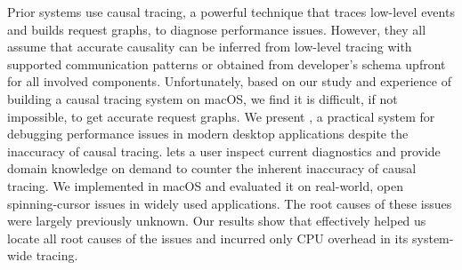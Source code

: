 Prior systems use causal tracing, a powerful technique that traces low-level
events and builds request graphs, to diagnose performance issues. However, they
all assume that accurate causality can be inferred from low-level tracing with
supported communication patterns or obtained from developer's schema upfront
for all involved components.  Unfortunately, based on our study and experience
of building a causal tracing system on macOS, we find it is difficult, if not
impossible, to get accurate request graphs.
We present \xxx, a practical system for debugging performance issues in modern
desktop applications despite the inaccuracy of causal tracing. \xxx lets a user
inspect current diagnostics and provide domain knowledge on demand to counter
the inherent inaccuracy of causal tracing. We implemented \xxx in macOS and
evaluated it on \nbug real-world, open spinning-cursor issues in widely used
applications. The root causes of these issues were largely previously unknown.
Our results show that \xxx effectively helped us locate all root causes of the
issues and incurred only \cpuoverhead CPU overhead in its system-wide tracing.
